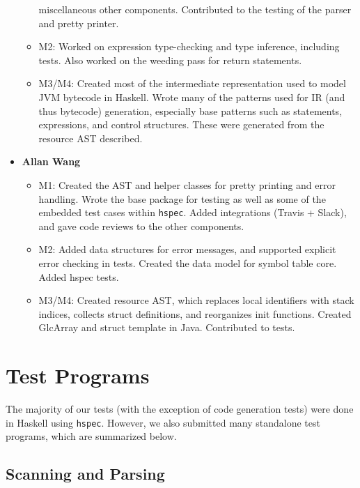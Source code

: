 \documentclass[11pt]{article}
\begin{document}
\begin{itemize}
\begin{itemize}
		miscellaneous other components.  Contributed to the testing of the
		parser and pretty printer.
		\item M2: Worked on expression type-checking and
		type inference, including tests. Also worked on the weeding pass for
		return statements.
		\item M3/M4: Created most of the intermediate representation used to
		model JVM bytecode in Haskell. Wrote many of the patterns used for IR
		(and thus bytecode) generation, especially base patterns such as
		statements, expressions, and control structures. These were generated
		from the resource AST described.
	\end{itemize}
	\item \textbf{Allan Wang}
	\begin{itemize}
		\item M1: Created the AST and helper classes for
		pretty printing and error handling.  Wrote the base package for
		testing as well as some of the embedded test cases within
		\texttt{hspec}.  Added integrations (Travis + Slack), and gave code
		reviews to the other components.
		\item M2: Added data structures for error messages,
		and supported explicit error checking in tests. Created the data
		model for symbol table core. Added hspec tests.
		\item M3/M4: Created resource AST, which replaces local identifiers with stack indices, collects struct definitions, and reorganizes init functions. Created GlcArray and struct template in Java. Contributed to tests.
	\end{itemize}
\end{itemize}

\newpage

 

\newpage
\appendix
\section{Test Programs}
\label{sec:appendixa}

The majority of our tests (with the exception of code generation tests) were done in
Haskell using \texttt{hspec}. However, we also submitted many standalone test programs,
which are summarized below.

\subsection*{Scanning and Parsing}
\end{document}
